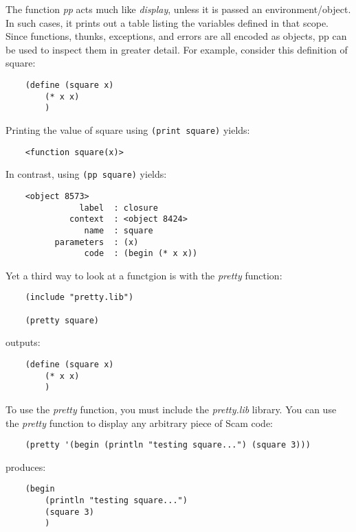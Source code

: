 The function {\it pp} acts much like {\it display}, unless it is
passed an environment/object. In such cases, it prints out a table
listing the variables defined in that scope.
Since functions, thunks, exceptions, and errors are all encoded
as objects, pp can be used to inspect them in greater detail.
For example, consider this definition of square:

\begin{verbatim}
    (define (square x)
        (* x x)
        )
\end{verbatim}

Printing the value of square using \verb!(print square)! yields:

\begin{verbatim}
    <function square(x)>
\end{verbatim}

In contrast, using \verb!(pp square)! yields:

\begin{verbatim}
    <object 8573>
               label  : closure
             context  : <object 8424>
                name  : square
          parameters  : (x)
                code  : (begin (* x x))
\end{verbatim}

Yet a third way to look at a functgion is with the {\it pretty} function:

\begin{verbatim}
    (include "pretty.lib")

    (pretty square)
\end{verbatim}

outputs:

\begin{verbatim}
    (define (square x)
        (* x x)
        )
\end{verbatim}

To use the {\it pretty} function, you must include the {\it pretty.lib} library.
You can use the {\it pretty} function to display any arbitrary piece of 
Scam code:

\begin{verbatim}
    (pretty '(begin (println "testing square...") (square 3)))
\end{verbatim}

produces:

\begin{verbatim}
    (begin
        (println "testing square...")
        (square 3)
        )
\end{verbatim}

